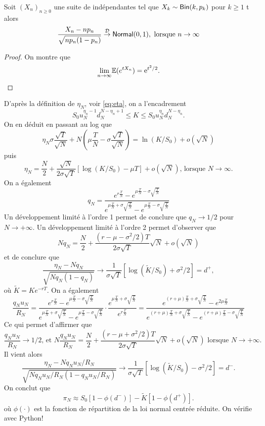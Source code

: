 \begin{lemma}
Soit $(X_n)_{n\geq0}$ une suite de \va indépendantes tel que $X_k\sim\mathsf{Bin}(k, p_k)$ pour $k\geq1$ t alors 
$$
\frac{X_n-np_n}{\sqrt{np_n(1-p_n)}}\overset{\mathcal{D}}{\rightarrow}\mathsf{Normal}(0,1), \text{ lorsque }n\rightarrow\infty
$$
\end{lemma}
\begin{proof}
On montre que 
$$
\underset{n\rightarrow \infty}{\lim} \mathbb{E}(e^{tX_n})= \mathrm{e}^{t^2/2}.
$$
\end{proof}
D'après la définition de $\eta_N$, voir \eqref{eq:eta}, on a l'encadrement
$$
S_0u_N^{\eta_n-1}d_N^{N-\eta_n+1}\leq K\leq S_0u_N^{\eta_n}d_N^{N-\eta_n}.
$$
On en déduit en passant au log que  
$$
\eta_N\sigma\frac{\sqrt{T}}{\sqrt{N}} + N\left(\mu\frac{T}{N} - \sigma\frac{\sqrt{T}}{\sqrt{N}}\right) =\ln(K/S_0)+o(\sqrt{N})
$$
puis
$$
\eta_N = \frac{N}{2}+\frac{\sqrt{N}}{2\sigma\sqrt{T}}\left[\log(K/S_0)-\mu T\right]+ o(\sqrt{N})\text{, lorsque }N\rightarrow\infty.
$$
On a également
$$
q_{N} = \frac{e^{r\frac TN}-e^{\mu\frac TN-\sigma\sqrt{\frac{T}{N}}}}{e^{\mu\frac TN+\sigma\sqrt{\frac TN}} - e^{\mu\frac TN-\sigma\sqrt{\frac{T}{N}}}}
$$
Un développement limité à l'ordre 1 permet de conclure que $q_N\rightarrow 1/2$ pour $N\rightarrow +\infty$. Un développement limité à l'ordre 2 permet d'observer que 
$$
Nq_N = \frac{N}{2}+\frac{(r-\mu-\sigma^2/2)T}{2\sigma\sqrt{T}}\sqrt{N} + o(\sqrt{N})
$$
et de conclure que 
$$
\frac{\eta_N - Nq_N}{\sqrt{Nq_N(1-q_N)}} \rightarrow \frac{1}{\sigma\sqrt{T}}\left[\log(\widetilde{K}/S_0) + \sigma^2/2\right]= d^+,
$$
où $\widetilde{K} = Ke^{-rT}$. On a également 
$$
\frac{q_Nu_N}{R_N} = \frac{e^{r\frac TN}-e^{\mu\frac TN-\sigma\sqrt{\frac{T}{N}}}}{e^{\mu\frac TN+\sigma\sqrt{\frac TN}} - e^{\mu\frac TN-\sigma\sqrt{\frac{T}{N}}}}
\cdot 
\frac{e^{\mu\frac TN+\sigma\sqrt{\frac{T}{N}}}}{e^{r\frac TN}} = 
\frac{e^{(r+\mu)\frac TN+\sigma\sqrt{\frac TN}}-e^{2\mu\frac TN}}{e^{(r+\mu)\frac TN+\sigma\sqrt{\frac TN}} - e^{(r+\mu)\frac TN-\sigma\sqrt{\frac{T}{N}}}}
$$
Ce qui permet d'affirmer que 
$$\frac{q_Nu_N}{R_N}\rightarrow 1/2\text{, et }
N\frac{q_Nu_N}{R_N} = \frac{N}{2}+\frac{(r-\mu+\sigma^2/2)T}{2\sigma\sqrt{T}}\sqrt{N} + o(\sqrt{N})\text{ lorsque } N\rightarrow +\infty.
$$
Il vient alors 
$$
\frac{\eta_N - Nq_Nu_N/R_N}{\sqrt{Nq_Nu_N/R_N(1-q_Nu_N/R_N)}} \rightarrow \frac{1}{\sigma\sqrt{T}}\left[\log(\widetilde{K}/S_0) - \sigma^2/2\right] = d^-. 
$$
On conclut que 
$$
\pi_N\approx S_0[1-\phi(d^-)]- \widetilde{K} [1-\phi(d^+)].
$$
où $\phi(\cdot)$ est la fonction de répartition de la loi normal centrée réduite. On vérifie avec Python!
